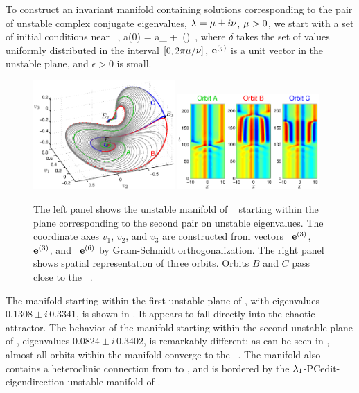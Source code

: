 To construct an invariant manifold containing solutions
corresponding to the pair of unstable complex conjugate eigenvalues,
$\eigExp = \eigRe \pm i\eigIm$,
$\eigRe > 0$, we start with a set of
initial conditions near \eqv\ ,
\beq
  a(0) = a_{{}} + \epsilon\,\exp(\delta)
\,,
where $\delta$ takes the set of values uniformly distributed in the
interval $[0,2\pi\eigRe/\eigIm]$, $\jEigvec{j}$ is a unit vector in the
unstable plane, and $\epsilon > 0$ is small.

\begin{figure}[t]
\begin{center}
\includegraphics[width=0.48\textwidth]{figs/ks22_E1_plane2_manifold_c.eps}
\includegraphics[width=0.48\textwidth]{figs/ks22_E1_plane2_orbits_c.eps}
\end{center}
\caption{
The left panel shows the unstable
manifold of \eqv\  starting within the plane
corresponding to the second pair on unstable eigenvalues. The
coordinate axes $v_1$, $v_2$, and $v_3$ are constructed from vectors
\Re\, $\jEigvec{3}$, \Im\, $\jEigvec{3}$, and \Re\, $\jEigvec{6}$
by Gram-Schmidt orthogonalization.
The right panel shows spatial representation of three orbits. Orbits
$B$ and $C$ pass close to the \eqv\ .
   }
\label{f:KS22E1man2}
\end{figure}

The manifold starting within the first unstable plane of , with
eigenvalues $0.1308\pm i\,0.3341$, is shown in
. It appears to fall directly into the
chaotic attractor.  The behavior of the manifold starting within
the second unstable plane of , eigenvalues $0.0824\pm i \, 0.3402$, is
remarkably different: as can be seen in ,
almost all orbits within the manifold converge to the \eqv\ .  The
manifold also contains a heteroclinic connection from  to ,
and is bordered by the $\eigExp[1]$-PCedit{-eigendirection} 
unstable manifold of .

